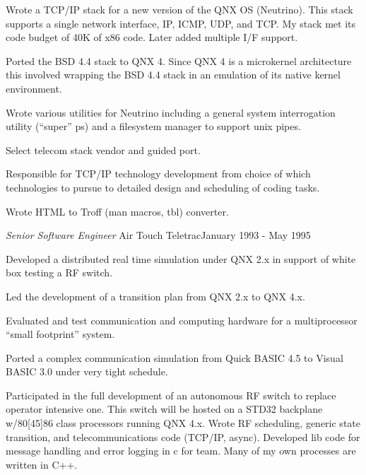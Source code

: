 \documentclass[margin]{res}
\begin{document}
\begin{resume}
                Wrote a TCP/IP stack for a new version of the QNX
                OS (Neutrino). This stack supports a single network
                interface, IP, ICMP, UDP, and TCP. My stack met its
                code budget of 40K of x86 code. Later added multiple
                I/F support.

                Ported the BSD 4.4 stack to QNX 4. Since QNX 4 is a
                microkernel architecture this involved wrapping the
                BSD 4.4 stack in an emulation of its native kernel
                environment.

                Wrote various utilities for Neutrino including a general
                system interrogation utility (“super” ps) and a
                filesystem manager to support unix pipes.

                Select telecom stack vendor and guided port.

                Responsible for TCP/IP technology development from choice
                of which technologies to pursue to detailed design and
                scheduling of coding tasks.

                Wrote HTML to Troff (man macros, tbl) converter.

                {\sl\large Senior Software Engineer } Air Touch Teletrac\hfill January 1993 - May 1995

                Developed a distributed real time simulation under QNX
                2.x in support of white box testing a RF switch.

                Led the development of a transition plan from QNX 2.x
                to QNX 4.x.

                Evaluated and test communication and computing hardware
                for a multiprocessor “small footprint” system.

                Ported a complex communication simulation from Quick
                BASIC 4.5 to Visual BASIC 3.0 under very tight schedule.

                Participated in the full development of an autonomous RF
                switch to replace operator intensive one. This switch
                will be hosted on a STD32 backplane w/80[45]86 class
                processors running QNX 4.x. Wrote RF scheduling, generic
                state transition, and telecommunications code (TCP/IP,
                async). Developed lib code for message handling and
                error logging in c for team. Many of my own processes
                are written in C++.


\end{resume}
\end{document}

